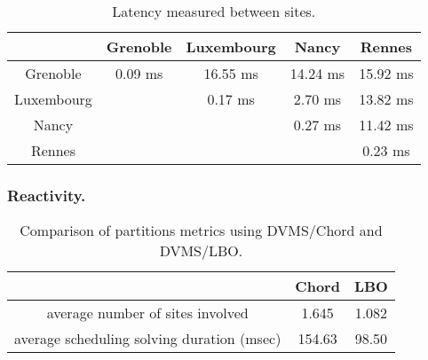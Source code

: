 \begin{table}[t!]

  \begin{center}
    \begin{tabular}{|c|c|c|c|c|}   

      \hline \multicolumn{1}{|p{2cm}|}{ } & \multicolumn{1}{|p{2cm}|}{\centering Grenoble }  & \multicolumn{1}{|p{2cm}|}{\centering Luxembourg } & \multicolumn{1}{|p{2cm}|}{\centering Nancy }& \multicolumn{1}{|p{2cm}|}{\centering Rennes } \\

      \hline
      Grenoble & 0.09 ms & 16.55 ms & 14.24 ms & 15.92 ms \\

      \hline
      Luxembourg &  & 0.17 ms & 2.70 ms & 13.82 ms \\

      \hline
      Nancy & &  & 0.27 ms & 11.42 ms \\

      \hline
      Rennes &  &  &  & 0.23 ms \\

      \hline
    \end{tabular}
  \end{center}
  \caption{\label{latency_table} Latency measured between sites.}
\end{table}





\subsubsection{Reactivity.}
\begin{table}[t!]

  \begin{center}
    \begin{tabular}{|c|c|c|}   

      \hline \multicolumn{1}{|p{3cm}|}{ }
       & \multicolumn{1}{|p{3cm}|}{\centering Chord }  & \multicolumn{1}{|p{3cm}|}{ \centering LBO}  \\

      \hline
      average number of sites involved & 1.645 & 1.082 \\

      \hline
      average scheduling solving duration (msec) & 154.63 & 98.50 \\

      \hline
    \end{tabular}
  \end{center}
  \caption{\label{partitions_table} Comparison of partitions metrics
    using DVMS/Chord and DVMS/LBO.}
  \vspace{-0.3cm}
\end{table}

